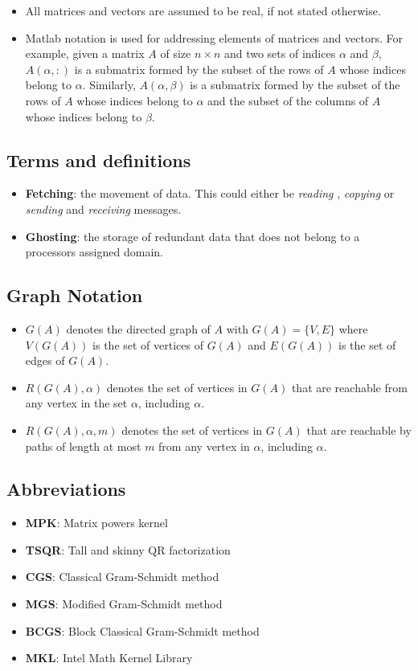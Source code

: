\documentclass{scrartcl}
\numberwithin{equation}{section}
\begin{document}
\begin{itemize}
\item All matrices and vectors are assumed to be real, if not stated otherwise.
\item Matlab notation is used for addressing elements of matrices and vectors. For example, given a matrix $A$ of size $n \times n$ and two sets of indices $\alpha$ and $\beta$, $A(\alpha,:)$ is a submatrix formed by the subset of the rows of $A$ whose indices belong to $\alpha$. Similarly, $A(\alpha, \beta)$ is a submatrix formed by the subset of the rows of $A$ whose indices belong to $\alpha$ and the subset of the columns of $A$ whose indices belong to $\beta$.
\end{itemize}
\subsection*{Terms and definitions}
\begin{itemize}
\item \textbf{Fetching}: the movement of data. This could either be \textit{reading} , \textit{copying} or \textit{sending} and \textit{receiving} messages.
\item \textbf{Ghosting}: the storage of redundant data that does not belong to a processors assigned domain.
\end{itemize}
\subsection*{Graph Notation}
\begin{itemize}
\item $G(A)$ denotes the directed graph of $A$ with $G(A) = \{V,E\}$ where $V(G(A))$ is the set of vertices of $G(A)$ and $E(G(A))$ is the set of edges of $G(A)$.
\item $R(G(A), \alpha)$ denotes the set of vertices in $G(A)$ that are reachable from any vertex in the set $\alpha$, including $\alpha$.
\item $R(G(A), \alpha, m)$ denotes the set of vertices in $G(A)$ that are reachable by paths of length at most $m$ from any vertex in $\alpha$, including $\alpha$.
\end{itemize}
\subsection*{Abbreviations}
\begin{itemize}
\item \textbf{MPK}: Matrix powers kernel
\item \textbf{TSQR}: Tall and skinny QR factorization
\item \textbf{CGS}: Classical Gram-Schmidt method
\item \textbf{MGS}: Modified Gram-Schmidt method
\item \textbf{BCGS}: Block Classical Gram-Schmidt method
\item \textbf{MKL}: Intel Math Kernel Library
\end{itemize}
\pagebreak
\end{document}
